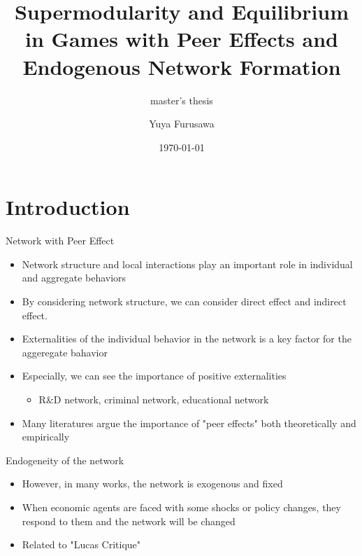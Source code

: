 \documentclass[10pt,dvipdfmx]{beamer}
\title{Supermodularity and Equilibrium in Games with Peer Effects and Endogenous Network Formation}
\subtitle{master's thesis}
\date{\today}
\author{Yuya Furusawa}
\institute{U-Tokyo, GSE}
\begin{document}
\maketitle


\section{Introduction}

\begin{frame}{Network with Peer Effect}
\begin{itemize}
    \item Network structure and local interactions play an important role in individual and aggregate behaviors
    \item By considering network structure, we can consider direct effect and indirect effect.
    \item Externalities of the individual behavior in the network is a key factor for the aggeregate bahavior
    \item Especially, we can see the importance of positive externalities
    \begin{itemize}
        \item R\&D network, criminal network, educational network
    \end{itemize}
    \item Many literatures argue the importance of "peer effects" both theoretically and empirically
\end{itemize}
\end{frame}

\begin{frame}{Endogeneity of the network}
\begin{itemize}
    \item However, in many works, the network is exogenous and fixed
    \item When economic agents are faced with some shocks or policy changes, they respond to them and the network will be changed
    \item Related to "Lucas Critique"
\end{itemize}
\end{frame}
\end{document}
